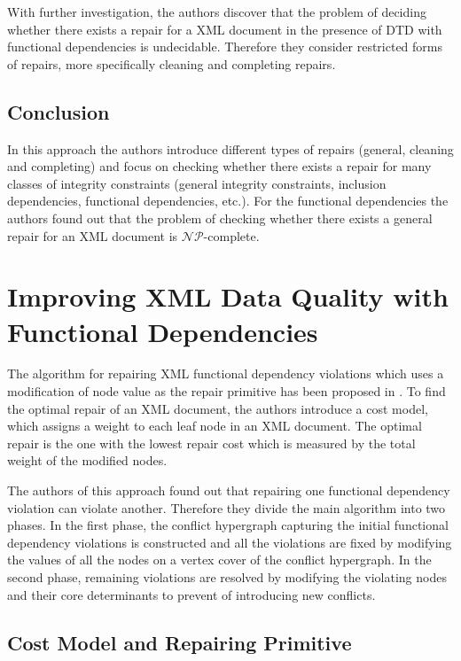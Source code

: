 With further investigation, the authors discover that the problem of deciding whether there exists a repair for a XML document in the presence of DTD with functional dependencies is undecidable. Therefore they consider restricted forms of repairs, more specifically cleaning and completing repairs.

\subsection{Conclusion}

In this approach the authors introduce different types of repairs (general, cleaning and completing) and focus on checking whether there exists a repair for many classes of integrity constraints (general integrity constraints, inclusion dependencies, functional dependencies, etc.). For the functional dependencies the authors found out that the problem of checking whether there exists a general repair for an XML document is $\mathcal{NP}$-complete.


\section{Improving XML Data Quality with Functional Dependencies}

The algorithm for repairing XML functional dependency violations which uses a modification of node value as the repair primitive has been proposed in \cite{ImprovingXML}. To find the optimal repair of an XML document, the authors introduce a cost model, which assigns a weight to each leaf node in an XML document. The optimal repair is the one with the lowest repair cost which is measured by the total weight of the modified nodes.

The authors of this approach found out that repairing one functional dependency violation can violate another. Therefore they divide the main algorithm into two phases. In the first phase, the conflict hypergraph capturing the initial functional dependency violations is constructed and all the violations are fixed by modifying the values of all the nodes on a vertex cover of the conflict hypergraph. In the second phase, remaining violations are resolved by modifying the violating nodes and their core determinants to prevent of introducing new conflicts.

\subsection{Cost Model and Repairing Primitive}

